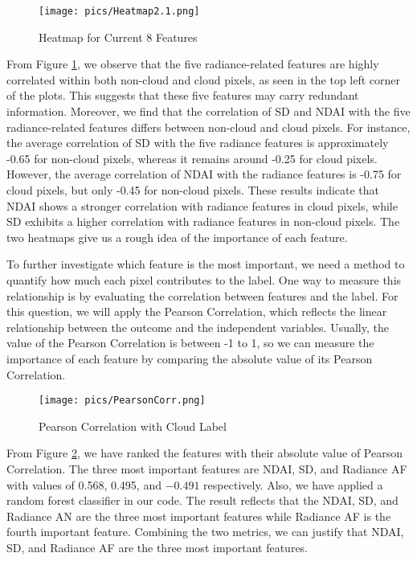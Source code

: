 \documentclass[10pt,letterpaper]{article}
\begin{document}
\begin{figure}[htbp]
    \centering
    \texttt{[image: pics/Heatmap2.1.png]}  
    \caption{Heatmap for Current 8 Features}
    \label{fig:heatmap2.1}
\end{figure}

From Figure \ref{fig:heatmap2.1}, we observe that the five radiance-related features are highly correlated within both non-cloud and cloud pixels, as seen in the top left corner of the plots. This suggests that these five features may carry redundant information. Moreover, we find that the correlation of SD and NDAI with the five radiance-related features differs between non-cloud and cloud pixels. For instance, the average correlation of SD with the five radiance features is approximately -0.65 for non-cloud pixels, whereas it remains around -0.25 for cloud pixels. However, the average correlation of NDAI with the radiance features is -0.75 for cloud pixels, but only -0.45 for non-cloud pixels. These results indicate that NDAI shows a stronger correlation with radiance features in cloud pixels, while SD exhibits a higher correlation with  radiance features in non-cloud pixels. The two heatmaps give us a rough idea of the importance of each feature.

To further investigate which feature is the most important, we need a method to quantify how much each pixel contributes to the label. One way to measure this relationship is by evaluating the correlation between features and the label. For this question, we will apply the Pearson Correlation, which reflects the linear relationship between the outcome and the independent variables. Usually, the value of the Pearson Correlation is between -1 to 1, so we can measure the importance of each feature by comparing the absolute value of its Pearson Correlation.

\begin{figure}[htbp]
    \centering
    \texttt{[image: pics/PearsonCorr.png]}  
    \caption{Pearson Correlation with Cloud Label}
    \label{fig:pearson}
\end{figure}

From Figure \ref{fig:pearson}, we have ranked the features with their absolute value of Pearson Correlation. The three most important features are NDAI, SD, and Radiance AF with values of 0.568, 0.495, and $-0.491$ respectively. Also, we have applied a random forest classifier in our code. The result reflects that the NDAI, SD, and Radiance AN are the three most important features while Radiance AF is the fourth important feature. Combining the two metrics, we can justify that NDAI, SD, and Radiance AF are the three most important features.
\end{document}
